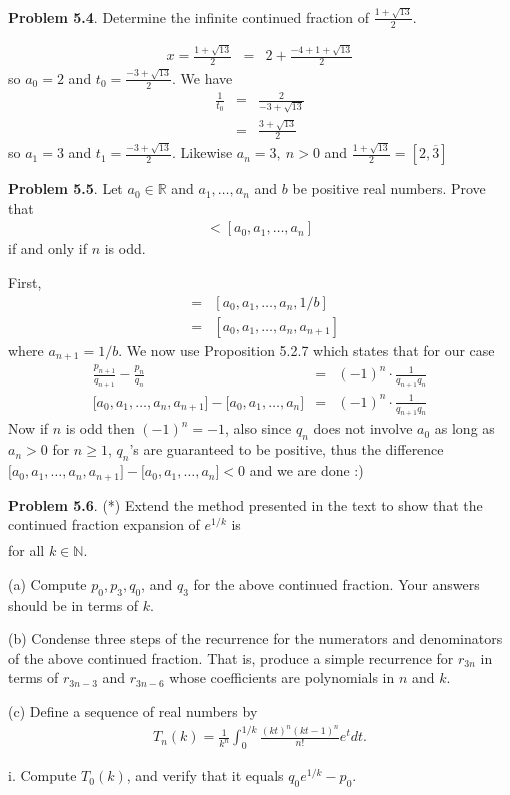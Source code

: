 \documentclass[aps,preprint,preprintnumbers,nofootinbib,showpacs,prd]{revtex4-1}
\newcommand{\nbea}{\begin{eqnarray*}}
\newcommand{\neea}{\end{eqnarray*}}
\begin{document}
{\bf Problem 5.4}. Determine the infinite continued fraction of $\frac{1+\sqrt{13}}{2}$.

%
\nbea
x = \frac{1+\sqrt{13}}{2} & = & 2 + \frac{-4 +1+\sqrt{13}}{2}
\neea
%
so $a_0 = 2$ and $t_0 = \frac{-3+\sqrt{13}}{2}$. We have
%
\nbea
\frac{1}{t_0} & = & \frac{2}{-3+\sqrt{13}} \\
& = & \frac{3 + \sqrt{13}}{2}
\neea
%
so $a_1 = 3$ and $t_1 = \frac{-3+\sqrt{13}}{2}$. Likewise $a_n = 3, ~n > 0$ and $\frac{1+\sqrt{13}}{2} = [2,\overline{3}]$

{\bf Problem 5.5}. Let $a_0 \in \mathbb{R}$ and $a_1 , \dots , a_n$ and $b$ be positive real numbers. Prove that
%
\nbea
[a_0 , a_1 , \dots , a_n + b] < [a_0 , a_1 , \dots , a_n ]
\neea
%
if and only if $n$ is odd.

First,
%
\nbea
[a_0 , a_1 , \dots , a_n + b] & = & [a_0 , a_1 , \dots , a_n , 1/b] \\
& = & [a_0 , a_1 , \dots , a_n, a_{n+1}]
\neea
%
where $a_{n+1} = 1/b$. We now use Proposition 5.2.7 which states that for our case
%
\nbea
\frac{p_{n+1}}{q_{n+1}} - \frac{p_{n}}{q_{n}} & = & (-1)^{n}\cdot \frac{1}{q_{n+1} q_{n}} \\
\lbrack a_0 , a_1 , \dots , a_n, a_{n+1}\rbrack - \lbrack a_0 , a_1 , \dots , a_n\rbrack & = & (-1)^{n}\cdot \frac{1}{q_{n+1} q_{n}}
\neea
%
Now if $n$ is odd then $(-1)^n = -1$, also since $q_n$ does not involve $a_0$ as long as $a_n > 0$ for $n \ge 1$, $q_n$'s are guaranteed to be positive, thus the difference $\lbrack a_0 , a_1 , \dots , a_n, a_{n+1}\rbrack - \lbrack a_0 , a_1 , \dots , a_n\rbrack < 0$ and we are done :)

{\bf Problem 5.6}. (*) Extend the method presented in the text to show that the continued fraction expansion of $e^{1/k}$ is
%
\nbea
[1, (k - 1), 1, 1, (3k - 1), 1, 1, (5k - 1), 1, 1, (7k - 1), \dots]
\neea
%
for all $k \in\mathbb{N}$.

(a) Compute $p_0 , p_3 , q_0$, and $q_3$ for the above continued fraction. Your answers should be in terms of $k$.

(b) Condense three steps of the recurrence for the numerators and denominators of the above continued fraction. That is, produce a simple recurrence for $r_{3n}$ in terms of $r_{3n-3}$ and $r_{3n-6}$ whose coefficients are polynomials in $n$ and $k$.

(c) Define a sequence of real numbers by
%
\nbea
T_n (k) = \frac{1}{k^n} \int_0^{1/k} \frac{(kt)^n (kt - 1)^n}{n!}e^tdt.
\neea
%

i. Compute $T_0 (k)$, and verify that it equals $q_0 e^{1/k} - p_0$.
\end{document}

